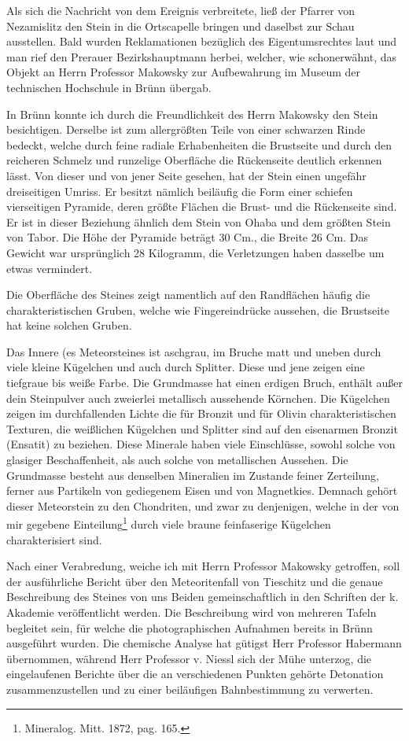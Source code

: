 \documentclass[a4paper, 11pt, oneside]{article}
\begin{document}
Als sich die Nachricht von dem Ereignis verbreitete, ließ der Pfarrer von Nezamislitz den Stein in die Ortscapelle bringen und daselbst zur Schau ausstellen. Bald wurden Reklamationen bezüglich des Eigentumsrechtes laut und man rief den Prerauer Bezirkshauptmann herbei, welcher, wie schonerwähnt, das Objekt an Herrn Professor Makowsky zur Aufbewahrung im Museum der technischen Hochschule in Brünn übergab.

In Brünn konnte ich durch die Freundlichkeit des Herrn Makowsky den Stein besichtigen. Derselbe ist zum allergrößten Teile von einer schwarzen Rinde bedeckt, welche durch feine radiale Erhabenheiten die Brustseite und durch den reicheren Schmelz und runzelige Oberfläche die Rückenseite deutlich erkennen lässt. Von dieser und von jener Seite gesehen, hat der Stein einen ungefähr dreiseitigen Umriss. Er besitzt nämlich beiläufig die Form einer schiefen vierseitigen Pyramide, deren größte Flächen die Brust- und die Rückenseite sind. Er ist in dieser Beziehung ähnlich dem Stein von Ohaba und dem größten Stein von Tabor. Die Höhe der Pyramide beträgt 30 Cm., die Breite 26 Cm. Das Gewicht war ursprünglich 28 Kilogramm, die Verletzungen haben dasselbe um etwas vermindert.

Die Oberfläche des Steines zeigt namentlich auf den Randflächen häufig die charakteristischen Gruben, welche wie Fingereindrücke aussehen, die Brustseite hat keine solchen Gruben.

Das Innere (es Meteorsteines ist aschgrau, im Bruche matt und uneben durch viele kleine Kügelchen und auch durch Splitter. Diese und jene zeigen eine tiefgraue bis weiße Farbe. Die Grundmasse hat einen erdigen Bruch, enthält außer dein Steinpulver auch zweierlei metallisch aussehende Körnchen. Die Kügelchen zeigen im durchfallenden Lichte die für Bronzit und für Olivin charakteristischen Texturen, die weißlichen Kügelchen und Splitter sind auf den eisenarmen Bronzit (Ensatit) zu beziehen. Diese Minerale haben viele Einschlüsse, sowohl solche von glasiger Beschaffenheit, als auch solche von metallischen Aussehen. Die Grundmasse besteht aus denselben Mineralien im Zustande feiner Zerteilung, ferner aus Partikeln von gediegenem Eisen und von Magnetkies. Demnach gehört dieser Meteorstein zu den Chondriten, und zwar zu denjenigen, welche in der von mir gegebene Einteilung\footnote{Mineralog. Mitt. 1872, pag. 165.} durch viele braune feinfaserige Kügelchen charakterisiert sind.

Nach einer Verabredung, weiche ich mit Herrn Professor Makowsky getroffen, soll der ausführliche Bericht über den Meteoritenfall von Tieschitz und die genaue Beschreibung des Steines von uns Beiden gemeinschaftlich in den Schriften der k. Akademie veröffentlicht werden. Die Beschreibung wird von mehreren Tafeln begleitet sein, für welche die photographischen Aufnahmen bereits in Brünn ausgeführt wurden. Die chemische Analyse hat gütigst Herr Professor Habermann übernommen, während Herr Professor v. Niessl sich der Mühe unterzog, die eingelaufenen Berichte über die an verschiedenen Punkten gehörte Detonation zusammenzustellen und zu einer beiläufigen Bahnbestimmung zu verwerten.
\end{document}
